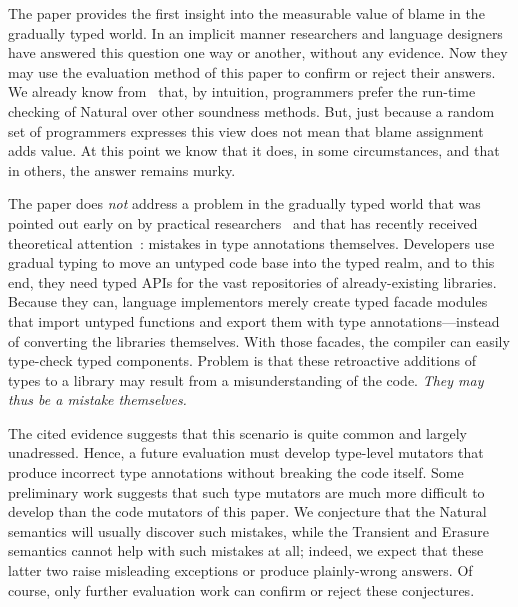 The paper provides the first insight into the measurable value of blame
 in the gradually typed world. In an implicit manner researchers and
language designers have answered this question one way or another, without any
evidence. Now they may use the evaluation method of this paper to
confirm or reject their answers. We already know from~\citet{tgpk-dls-2018}
that, by intuition, programmers prefer the run-time checking of Natural over
other soundness methods. But, just because a random set of programmers expresses
this view does not mean that blame assignment adds value. At this point we know
that it does, in some circumstances, and that in others, the answer remains
murky.

The paper does {\em not\/} address a problem in the gradually typed world that
was pointed out early on by practical researchers~\cite{incorrect-ts,
sta-nt-base-types, wmwz-ecoop-2017} and that has recently received theoretical
attention~\cite{gfd-oopsla-2019, cc-oopsla-20}: mistakes in type annotations themselves.
Developers use gradual typing to move an untyped code base into the typed realm,
and to this end, they need typed APIs for the vast repositories of
already-existing libraries. Because they can, language implementors merely
create typed facade modules that import untyped functions and export them with
type annotations---instead of converting the libraries themselves. With those
facades, the compiler can easily type-check typed components. Problem is
that these retroactive additions of types to a library may result from a misunderstanding of the
code. \emph{They may thus be a mistake themselves.}

The cited evidence suggests that this scenario is quite common and largely unadressed.
Hence, a future evaluation must develop type-level mutators that produce incorrect type
annotations without breaking the code itself. Some preliminary work suggests
that such type mutators are much more difficult to develop than the code
mutators of this paper. We conjecture that the Natural semantics will
usually discover such mistakes, while the Transient and Erasure semantics cannot
help with such mistakes at all; indeed, we expect that these latter two raise
misleading exceptions or produce plainly-wrong answers.  Of course, only further
evaluation work can confirm or reject these conjectures.



